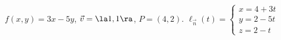 {$f(x,y) = 3x-5y$,  $\vec v = \la 1,1\ra$, $P=(4,2)$.
}
{
$\ell_{\vec n}(t) = \left\{\begin{array}{l} x = 4+3t\\ y = 2-5t \\ z = 2 -t \end{array} \right.$ 
}
